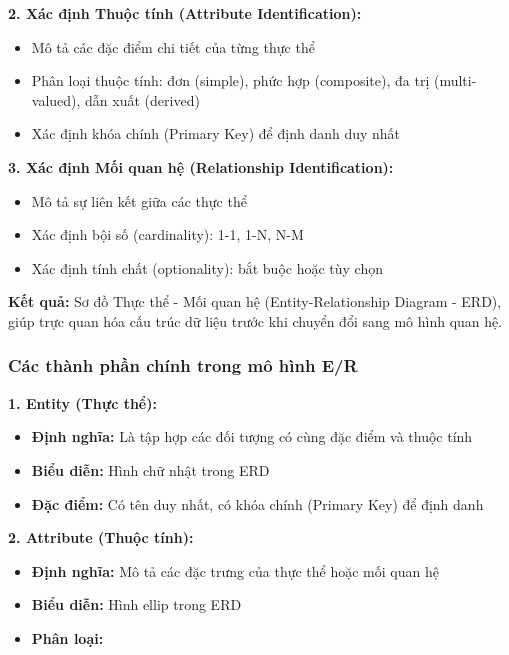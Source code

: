 \documentclass[12pt,a4paper]{article}
\begin{document}
\textbf{2. Xác định Thuộc tính (Attribute Identification):}
\begin{itemize}
    \item Mô tả các đặc điểm chi tiết của từng thực thể
    \item Phân loại thuộc tính: đơn (simple), phức hợp (composite), đa trị (multi-valued), dẫn xuất (derived)
    \item Xác định khóa chính (Primary Key) để định danh duy nhất
\end{itemize}

\textbf{3. Xác định Mối quan hệ (Relationship Identification):}
\begin{itemize}
    \item Mô tả sự liên kết giữa các thực thể
    \item Xác định bội số (cardinality): 1-1, 1-N, N-M
    \item Xác định tính chất (optionality): bắt buộc hoặc tùy chọn
\end{itemize}

\textbf{Kết quả:} Sơ đồ Thực thể - Mối quan hệ (Entity-Relationship Diagram - ERD), giúp trực quan hóa cấu trúc dữ liệu trước khi chuyển đổi sang mô hình quan hệ.

\subsubsection{Các thành phần chính trong mô hình E/R}

\textbf{1. Entity (Thực thể):}
\begin{itemize}
    \item \textbf{Định nghĩa:} Là tập hợp các đối tượng có cùng đặc điểm và thuộc tính
    \item \textbf{Biểu diễn:} Hình chữ nhật trong ERD
    \item \textbf{Đặc điểm:} Có tên duy nhất, có khóa chính (Primary Key) để định danh
\end{itemize}

\textbf{2. Attribute (Thuộc tính):}
\begin{itemize}
    \item \textbf{Định nghĩa:} Mô tả các đặc trưng của thực thể hoặc mối quan hệ
    \item \textbf{Biểu diễn:} Hình ellip trong ERD
    \item \textbf{Phân loại:}
\end{itemize}
\end{document}
